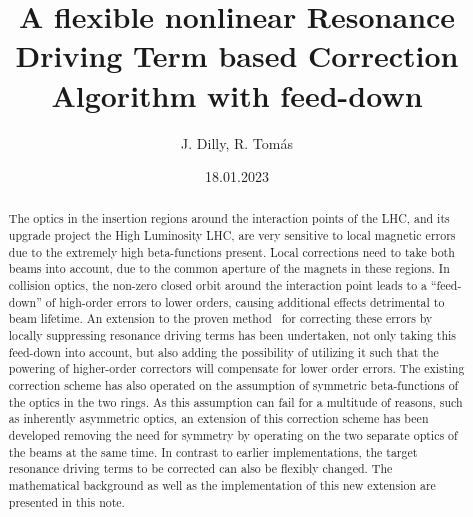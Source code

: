 \documentclass[dvipsnames]{simplenote}    %
\date{18.01.2023}
\title{A flexible nonlinear Resonance Driving Term based Correction Algorithm with feed-down}
\author{J. Dilly, R. Tom\'as}
\begin{document}
\graphicspath{
    {./images/}
}
\maketitle 

\begin{abstract}
The optics in the insertion regions around the interaction points of the LHC, and its upgrade project the High Luminosity LHC, 
are very sensitive to local magnetic errors due to the extremely high beta-functions present.
Local corrections need to take both beams into account, due to the common aperture of the magnets in these regions.
In collision optics, the non-zero closed orbit around the interaction point leads to a ``feed-down'' of high-order errors to lower orders, 
causing additional effects detrimental to beam lifetime. 
An extension to the proven method~\cite{BruningDynamicApertureStudies2004} for correcting these errors by locally suppressing resonance driving terms has been undertaken, 
not only taking this feed-down into account, but also adding the possibility of utilizing it such that the powering of higher-order correctors will compensate 
for lower order errors.
The existing correction scheme has also operated on the assumption of symmetric beta-functions of the optics in the two rings.
As this assumption can fail for a multitude of reasons, such as inherently asymmetric optics, 
an extension of this correction scheme has been developed removing the need for symmetry by operating on the two separate optics of the beams at the same time.
In contrast to earlier implementations, the target resonance driving terms to be corrected can also be flexibly changed. 
The mathematical background as well as the implementation of this new extension are presented in this note.
\end{abstract}


\tableofcontents
\newpage





\FloatBarrier


\FloatBarrier


\FloatBarrier


\FloatBarrier


\FloatBarrier



\clearpage

% 
\end{document}
